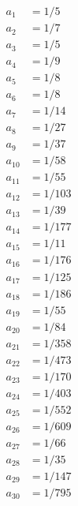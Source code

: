 \documentclass{article}
\begin{document}
\begin{preview}
\begin{align*}
a_{1} &= 1/5 \\
a_{2} &= 1/7 \\
a_{3} &= 1/5 \\
a_{4} &= 1/9 \\
a_{5} &= 1/8 \\
a_{6} &= 1/8 \\
a_{7} &= 1/14 \\
a_{8} &= 1/27 \\
a_{9} &= 1/37 \\
a_{10} &= 1/58 \\
a_{11} &= 1/55 \\
a_{12} &= 1/103 \\
a_{13} &= 1/39 \\
a_{14} &= 1/177 \\
a_{15} &= 1/11 \\
a_{16} &= 1/176 \\
a_{17} &= 1/125 \\
a_{18} &= 1/186 \\
a_{19} &= 1/55 \\
a_{20} &= 1/84 \\
a_{21} &= 1/358 \\
a_{22} &= 1/473 \\
a_{23} &= 1/170 \\
a_{24} &= 1/403 \\
a_{25} &= 1/552 \\
a_{26} &= 1/609 \\
a_{27} &= 1/66 \\
a_{28} &= 1/35 \\
a_{29} &= 1/147 \\
a_{30} &= 1/795 \\
\end{align*}
\end{preview}
\end{document}
